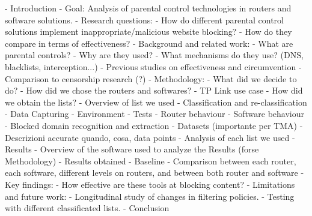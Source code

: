 - Introduction
    - Goal: Analysis of parental control technologies in routers and software solutions.
    - Research questions:
        - How do different parental control solutions implement inappropriate/malicious website blocking?
        - How do they compare in terms of effectiveness?
- Background and related work:
    - What are parental controls?
    - Why are they used?
    - What mechanisms do they use? (DNS, blacklists, interception...)
    - Previous studies on effectiveness and circumvention
    - Comparison to censorship research (?)
- Methodology:
    - What did we decide to do?
    - How did we chose the routers and softwares?
    - TP Link use case
    - How did we obtain the lists?
        - Overview of list we used
        - Classification and re-classification
    - Data Capturing
        - Environment
        - Tests
        - Router behaviour
        - Software behaviour
        - Blocked domain recognition and extraction
- Datasets (importante per TMA)
    - Descrizioni accurate quando, cosa, data points
    - Analysis of each list we used
- Results
    - Overview of the software used to analyze the Results (forse Methodology)
    - Results obtained 
    - Baseline
    - Comparison between each router, each software, different levels on routers, and between both router and software
    - Key findings:
        - How effective are these tools at blocking content?
- Limitations and future work:
    - Longitudinal study of changes in filtering policies.
    - Testing with different classificated lists.
- Conclusion
